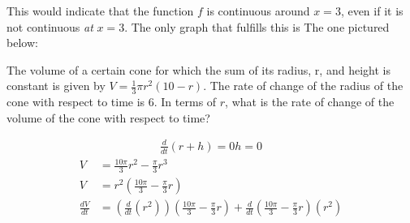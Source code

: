 \documentclass[12pt,letterpaper, onecolumn]{exam}
\begin{document}
\begin{questions}
		\begin{solution}
			This would indicate that the function $f$ is continuous around $x=3$, even if it is not continuous \emph{at} $x=3$.
			The only graph that fulfills this is The one pictured below: \\
		\end{solution}
		\question The volume of a certain cone for which the sum of its radius, r, and height is constant is given by $V=\frac{1}{3} \pi r^2 (10-r)$. The rate of change of the radius of the cone with respect to time is 6. In terms of $r$, what is the rate of change of the volume of the cone with respect to time?
		\begin{solution}
			\begin{gather*}
				\frac{d}{dt}(r+h) = 0
				h=0
			\end{gather*}
			\begin{align*}
				V 			  &= \frac{10\pi}{3} r^2 - \frac{\pi}{3}r^3 \\
				V 			  &= r^2 \left( \frac{10\pi}{3} - \frac{\pi}{3}r \right)  \\
				\frac{dV}{dt} &= \left( \frac{d}{dt} (r^2)\right) \left(\frac{10\pi}{3} - \frac{\pi}{3}r \right) + \frac{d}{dt} \left( \frac{10\pi}{3} - \frac{\pi}{3}r \right) (r^2)
			\end{align*}
		\end{solution}
		\question
		\question
		\question
	\end{questions}
\end{document}
